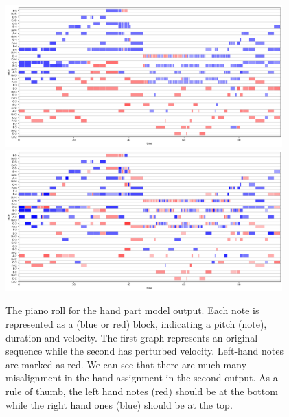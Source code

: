 \begin{figure}[!ht]
\centering
\includegraphics[width=0.95\textwidth]{images/hand_part1.png}
\includegraphics[width=0.95\textwidth]{images/hand_part2.png}
\caption[The piano roll for the hand part model output]{The piano roll for the hand part model output. Each note is represented as a (blue or red) block, indicating a pitch (note), duration and velocity. The first graph represents an original sequence while the second has perturbed velocity. Left-hand notes are marked as red. We can see that there are much many misalignment in the hand assignment in the second output. As a rule of thumb, the left hand notes (red) should be at the bottom while the right hand ones (blue) should be at the top.}\end{figure}


